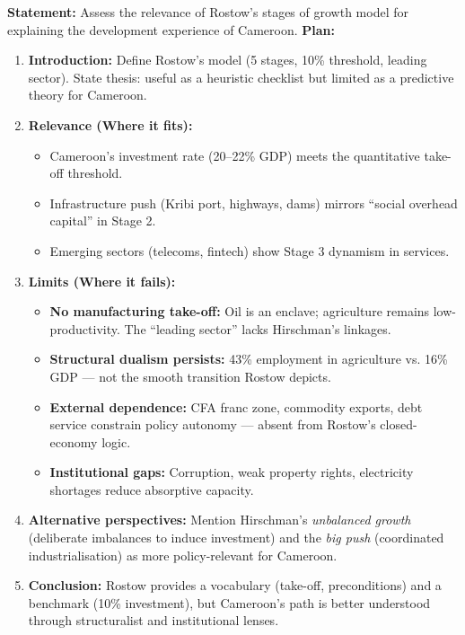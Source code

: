\documentclass[11pt]{article}
\begin{document}
\begin{exoresolu}
\textbf{Statement:} Assess the relevance of Rostow's stages of growth model for explaining the development experience of Cameroon.
\tcblower
\textbf{Plan:}
\begin{enumerate}
  \item \textbf{Introduction:} Define Rostow's model (5 stages, 10\% threshold, leading sector). State thesis: useful as a heuristic checklist but limited as a predictive theory for Cameroon.
  \item \textbf{Relevance (Where it fits):}
  \begin{itemize}
    \item Cameroon's investment rate (20–22\% GDP) meets the quantitative take-off threshold.
    \item Infrastructure push (Kribi port, highways, dams) mirrors “social overhead capital” in Stage 2.
    \item Emerging sectors (telecoms, fintech) show Stage 3 dynamism in services.
  \end{itemize}
  \item \textbf{Limits (Where it fails):}
  \begin{itemize}
    \item \textbf{No manufacturing take-off:} Oil is an enclave; agriculture remains low-productivity. The “leading sector” lacks Hirschman's linkages.
    \item \textbf{Structural dualism persists:} 43\% employment in agriculture vs. 16\% GDP — not the smooth transition Rostow depicts.
    \item \textbf{External dependence:} CFA franc zone, commodity exports, debt service constrain policy autonomy — absent from Rostow's closed-economy logic.
    \item \textbf{Institutional gaps:} Corruption, weak property rights, electricity shortages reduce absorptive capacity.
  \end{itemize}
  \item \textbf{Alternative perspectives:} Mention Hirschman's \emph{unbalanced growth} (deliberate imbalances to induce investment) and the \emph{big push} (coordinated industrialisation) as more policy-relevant for Cameroon.
  \item \textbf{Conclusion:} Rostow provides a vocabulary (take-off, preconditions) and a benchmark (10\% investment), but Cameroon's path is better understood through structuralist and institutional lenses.
\end{enumerate}
\end{exoresolu}
\end{document}
